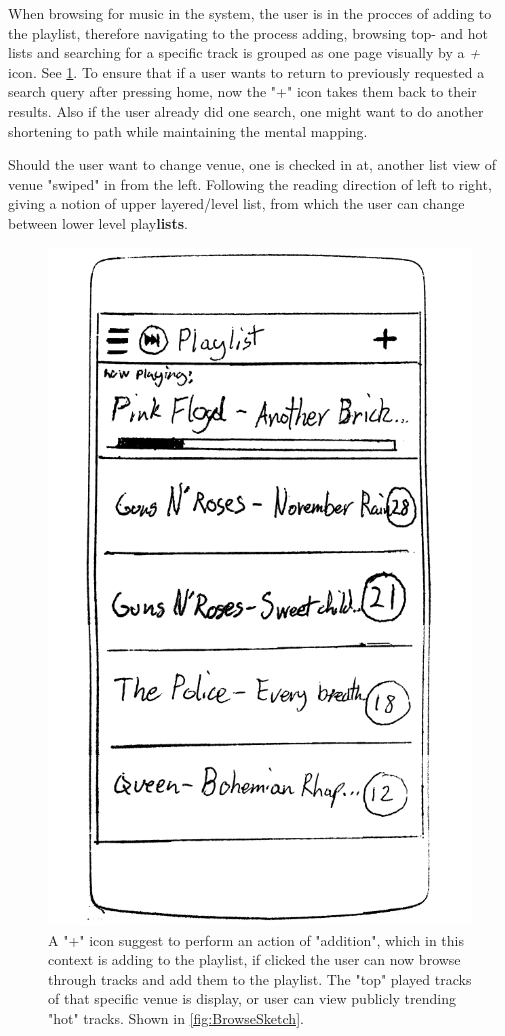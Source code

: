 When browsing for music in the system, the user is in the procces of
adding to the playlist, therefore navigating to the process adding,
browsing top- and hot lists and searching for a specific track is
grouped as one page visually by a \emph{+} icon. See
\cref{fig:PlaylistSketch}. To ensure that if a user wants to return to
previously requested a search query after pressing home, now the "+"
icon takes them back to their results. Also if the user already did
one search, one might want to do another shortening to path while
maintaining the mental mapping. 

Should the user want to change venue, one is checked in at, another list view of venue "swiped" in from the left. Following the reading direction of left to right, giving a notion of upper layered/level  list, from which the user can change between lower level play\textbf{lists}.


\begin{figure}[hbtp]
  \centering
  \includegraphics[width=0.5\linewidth]{Images/sketch3.png}
  \caption{A "+" icon suggest to perform an action of "addition", which in this context is adding to the playlist, if clicked the user can now browse through tracks and add them to the playlist. The "top" played tracks of that specific venue is display, or user can view publicly trending "hot" tracks. Shown in \cref{fig:BrowseSketch}.}
  \label{fig:PlaylistSketch}
\end{figure}

